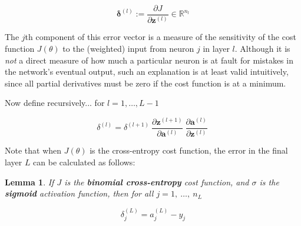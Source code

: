 \documentclass{article}[11pt]
\newtheorem{lemma}{Lemma}
\begin{document}
        $$
        \mathbf{\delta}^{(l)} :=  \frac{\partial J}{\partial \mathbf{z}^{(l)}} \in \mathbb{R}^{n_l}
        $$
        
        The $j$th component of this error vector is a measure of the sensitivity of the cost function $J(\theta)$ to the (weighted) input from neuron $j$ in layer $l$. Although it is \textit{not} a direct measure of how much a particular neuron is at fault for mistakes in the network's eventual output, such an explanation is at least valid intuitively, since all partial derivatives must be zero if the cost function is at a minimum.
        
        
        Now define recursively... for $l = 1, \ldots, L-1$
        
        $$
        \delta^{(l)} =
        \delta^{(l+1)} \
        \frac{\partial \mathbf{z}^{(l+1)}}{\partial \mathbf{a}^{(l)}} \
        \frac{\partial \mathbf{a}^{(l)}}{\partial \mathbf{z}^{(l)}} \
        $$
        
        
        
        Note that when $J(\theta)$ is the cross-entropy cost function, the error in the final layer $L$ can be calculated as follows:
        
        \begin{lemma}
            
            If $J$ is the \textbf{binomial cross-entropy} cost function, and $\sigma$ is the \textbf{sigmoid} activation function, then for all $j = 1, \ \ldots, \ n_L$
            
            $$
            \delta^{(L)}_j = a^{(L)}_j - y_j
            $$
            
        \end{lemma}
        
\end{document}

